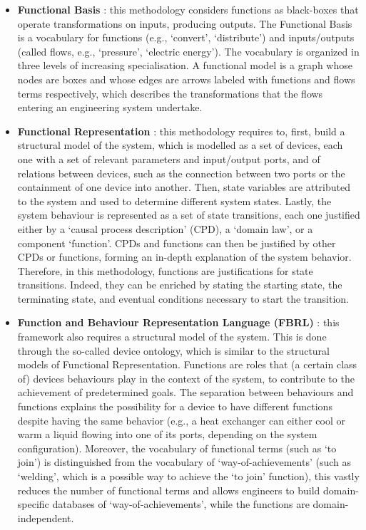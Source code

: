 \documentclass[
]{ceurart}
\begin{document}
\begin{itemize}
    \item \textbf{Functional Basis} \cite{hirtz_functional_2002,stone_development_2000}: this methodology considers functions as black-boxes that operate transformations on inputs, producing outputs. The Functional Basis is a vocabulary for functions (e.g., `convert', `distribute') and inputs/outputs (called flows, e.g., `pressure', `electric energy'). The vocabulary is organized in three levels of increasing specialisation. A functional model is a graph whose nodes are boxes and whose edges are arrows labeled with functions and flows terms respectively, which describes the transformations that the flows entering an engineering system undertake.
    \item \textbf{Functional Representation} \cite{chandrasekaranFunctionalRepresentationDesign1993}: this methodology requires to, first, build a structural model of the system, which is modelled as a set of devices, each one with a set of relevant parameters and input/output ports, and of relations between devices, such as the connection between two ports or the containment of one device into another. Then, state variables are attributed to the system and used to determine different system states. Lastly, the system behaviour is represented as a set of state transitions, each one justified either by a `causal process description' (CPD), a `domain law', or a component `function'. CPDs and functions can then be justified by other CPDs or functions, forming an in-depth explanation of the system behavior. Therefore, in this methodology, functions are justifications for state transitions. Indeed, they can be enriched by stating the starting state, the terminating state, and eventual conditions necessary to start the transition.
    \item \textbf{Function and Behaviour Representation Language (FBRL)} \cite{sasajimaFBRLFunctionBehavior1995, kitamuraOntologicalModelDevice2006}: this framework also requires a structural model of the system. This is done through the so-called device ontology, which is similar to the structural models of Functional Representation. %
    Functions are roles that (a certain class of) devices behaviours play in the context of the system, to contribute to the achievement of predetermined goals. The separation between behaviours and functions explains the possibility for a device to have different functions despite having the same behavior (e.g., a heat exchanger can either cool or warm a liquid flowing into one of its ports, depending on the system configuration). Moreover, the vocabulary of functional terms (such as `to join') is distinguished from the vocabulary of `way-of-achievements' (such as `welding', which is a possible way to achieve the `to join' function), this vastly reduces the number of functional terms and allows engineers to build domain-specific databases of `way-of-achievements', while the functions are domain-independent. 

\end{itemize}
\end{document}
